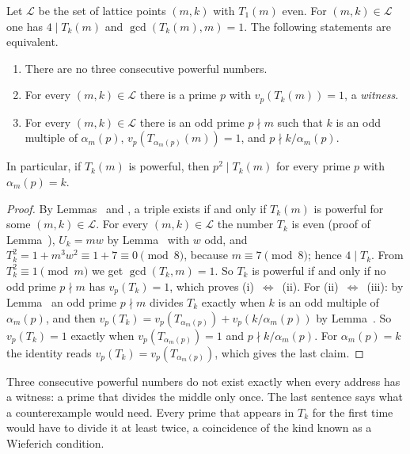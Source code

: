 \begin{theorem}
Let $\mathcal{L}$ be the set of lattice points $(m, k)$ with $T_1(m)$ even. For $(m, k) \in \mathcal{L}$ one has $4 \mid T_k(m)$ and
$\gcd(T_k(m), m) = 1$. The following statements are equivalent.
\begin{enumerate}
  \item[(i)] There are no three consecutive powerful numbers.
  \item[(ii)] For every $(m, k) \in \mathcal{L}$ there is a prime $p$ with $v_p(T_k(m)) = 1$, a \emph{witness}.
  \item[(iii)] For every $(m, k) \in \mathcal{L}$ there is an odd prime $p \nmid m$ such that $k$ is an odd multiple of $\alpha_m(p)$,
  $v_p(T_{\alpha_m(p)}(m)) = 1$, and $p \nmid k/\alpha_m(p)$.
\end{enumerate}
In particular, if $T_k(m)$ is powerful, then $p^2 \mid T_k(m)$ for every prime $p$ with $\alpha_m(p) = k$.
\end{theorem}

\begin{proof}
By Lemmas~ and , a triple exists if and only if $T_k(m)$ is powerful for some $(m, k) \in \mathcal{L}$.
For every $(m, k) \in \mathcal{L}$ the number $T_k$ is even (proof of Lemma~), $U_k = m w$ by Lemma~ with
$w$ odd, and $T_k^2 = 1 + m^3 w^2 \equiv 1 + 7 \equiv 0 \pmod 8$, because $m \equiv 7 \pmod 8$; hence $4 \mid T_k$. From $T_k^2 \equiv 1 \pmod m$ we get $\gcd(T_k, m) = 1$. So $T_k$ is powerful if and only if no odd prime $p \nmid m$ has
$v_p(T_k) = 1$, which proves (i)~$\Leftrightarrow$~(ii). For (ii)~$\Leftrightarrow$~(iii): by Lemma~ an odd prime $p \nmid m$
divides $T_k$ exactly when $k$ is an odd multiple of $\alpha_m(p)$, and then $v_p(T_k) = v_p(T_{\alpha_m(p)}) + v_p(k/\alpha_m(p))$ by Lemma~. So $v_p(T_k) = 1$ exactly when $v_p(T_{\alpha_m(p)}) = 1$ and
$p \nmid k/\alpha_m(p)$. For $\alpha_m(p) = k$ the identity reads $v_p(T_k) = v_p(T_{\alpha_m(p)})$, which gives the last claim.
\end{proof}

\inwords Three consecutive powerful numbers do not exist exactly when every address has a witness: a prime that divides the middle
only once. The last sentence says what a counterexample would need. Every prime that appears in $T_k$ for the first time would have to
divide it at least twice, a coincidence of the kind known as a Wieferich condition.

